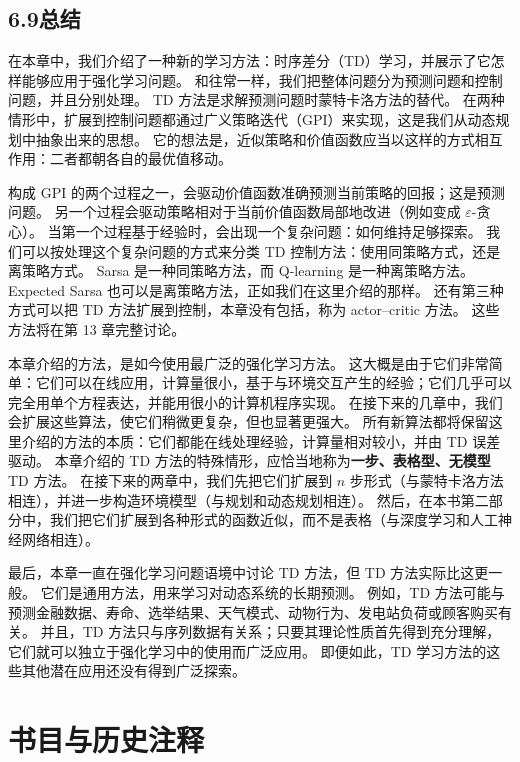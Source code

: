 \documentclass[UTF8, 12pt, fontset=fandol, oneside]{ctexart}
\begin{document}
\subsection*{6.9\quad 总结}

在本章中，我们介绍了一种新的学习方法：时序差分（TD）学习，并展示了它怎样能够应用于强化学习问题。
和往常一样，我们把整体问题分为预测问题和控制问题，并且分别处理。
TD 方法是求解预测问题时蒙特卡洛方法的替代。
在两种情形中，扩展到控制问题都通过广义策略迭代（GPI）来实现，这是我们从动态规划中抽象出来的思想。
它的想法是，近似策略和价值函数应当以这样的方式相互作用：二者都朝各自的最优值移动。

构成 GPI 的两个过程之一，会驱动价值函数准确预测当前策略的回报；这是预测问题。
另一个过程会驱动策略相对于当前价值函数局部地改进（例如变成 $\varepsilon$-贪心）。
当第一个过程基于经验时，会出现一个复杂问题：如何维持足够探索。
我们可以按处理这个复杂问题的方式来分类 TD 控制方法：使用同策略方式，还是离策略方式。
Sarsa 是一种同策略方法，而 Q-learning 是一种离策略方法。
Expected Sarsa 也可以是离策略方法，正如我们在这里介绍的那样。
还有第三种方式可以把 TD 方法扩展到控制，本章没有包括，称为 actor--critic 方法。
这些方法将在第 13 章完整讨论。

本章介绍的方法，是如今使用最广泛的强化学习方法。
这大概是由于它们非常简单：它们可以在线应用，计算量很小，基于与环境交互产生的经验；它们几乎可以完全用单个方程表达，并能用很小的计算机程序实现。
在接下来的几章中，我们会扩展这些算法，使它们稍微更复杂，但也显著更强大。
所有新算法都将保留这里介绍的方法的本质：它们都能在线处理经验，计算量相对较小，并由 TD 误差驱动。
本章介绍的 TD 方法的特殊情形，应恰当地称为\textbf{一步、表格型、无模型} TD 方法。
在接下来的两章中，我们先把它们扩展到 $n$ 步形式（与蒙特卡洛方法相连），并进一步构造环境模型（与规划和动态规划相连）。
然后，在本书第二部分中，我们把它们扩展到各种形式的函数近似，而不是表格（与深度学习和人工神经网络相连）。

最后，本章一直在强化学习问题语境中讨论 TD 方法，但 TD 方法实际比这更一般。
它们是通用方法，用来学习对动态系统的长期预测。
例如，TD 方法可能与预测金融数据、寿命、选举结果、天气模式、动物行为、发电站负荷或顾客购买有关。
并且，TD 方法只与序列数据有关系；只要其理论性质首先得到充分理解，它们就可以独立于强化学习中的使用而广泛应用。
即便如此，TD 学习方法的这些其他潜在应用还没有得到广泛探索。

\section*{书目与历史注释}
\end{document}
